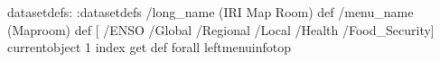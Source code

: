 \begin{ingrid}
datasetdefs:
:datasetdefs
/long_name (IRI Map Room) def
/menu_name (Maproom) def
[ /ENSO /Global /Regional /Local /Health /Food_Security]
{ currentobject 1 index get  def} forall
leftmenuinfotop
\end{ingrid}
